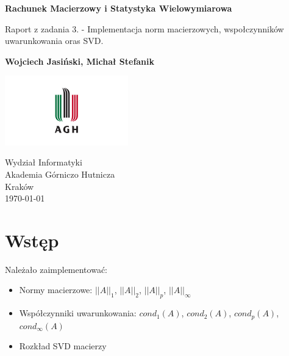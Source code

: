 \documentclass[a4paper]{article}
\begin{document}
\begin{titlepage}
    \begin{center}
        \vspace*{1cm}

        \Huge
        \textbf{Rachunek Macierzowy i Statystyka Wielowymiarowa}

        \Large
        \vspace{0.5cm}
        Raport z zadania 3. - Implementacja norm macierzowych, wspołczynników uwarunkowania oras SVD.

        \vspace{1.5cm}

        \textbf{Wojciech Jasiński, Michał Stefanik}

        \vfill


        \vspace{0.8cm}

        \includegraphics[width=0.4\textwidth]{agh_logo.jpg}

        Wydział Informatyki\\
        Akademia Górniczo Hutnicza\\
        Kraków\\
        \today

    \end{center}
\end{titlepage}

\tableofcontents
\newpage




\section{Wstęp}


Należało zaimplementować:
\begin{itemize}
    \item Normy macierzowe: $||A||_1$, $||A||_2$, $||A||_p$, $||A||_{\infty}$ 
    \item Współczynniki uwarunkowania: $cond_1(A)$, $cond_2(A)$, $cond_p(A)$, $cond_{\infty}(A)$
    \item Rozkład SVD macierzy
\end{itemize}
\end{document}
